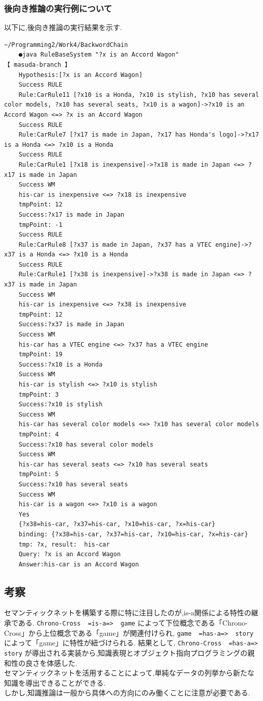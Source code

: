 \documentclass[uplatex,12pt]{jsarticle}
\begin{document}
\subsubsection{後向き推論の実行例について}
以下に,後向き推論の実行結果を示す.
\begin{lstlisting}[caption=後向き推論の実行結果, label=mid]
    ~/Programming2/Work4/BackwordChain
    ●java RuleBaseSystem "?x is an Accord Wagon"                                                                                                                                                                              【 masuda-branch 】
    Hypothesis:[?x is an Accord Wagon]
    Success RULE
    Rule:CarRule11 [?x10 is a Honda, ?x10 is stylish, ?x10 has several color models, ?x10 has several seats, ?x10 is a wagon]->?x10 is an Accord Wagon <=> ?x is an Accord Wagon
    Success RULE
    Rule:CarRule7 [?x17 is made in Japan, ?x17 has Honda's logo]->?x17 is a Honda <=> ?x10 is a Honda
    Success RULE
    Rule:CarRule1 [?x18 is inexpensive]->?x18 is made in Japan <=> ?x17 is made in Japan
    Success WM
    his-car is inexpensive <=> ?x18 is inexpensive
    tmpPoint: 12
    Success:?x17 is made in Japan
    tmpPoint: -1
    Success RULE
    Rule:CarRule8 [?x37 is made in Japan, ?x37 has a VTEC engine]->?x37 is a Honda <=> ?x10 is a Honda
    Success RULE
    Rule:CarRule1 [?x38 is inexpensive]->?x38 is made in Japan <=> ?x37 is made in Japan
    Success WM
    his-car is inexpensive <=> ?x38 is inexpensive
    tmpPoint: 12
    Success:?x37 is made in Japan
    Success WM
    his-car has a VTEC engine <=> ?x37 has a VTEC engine
    tmpPoint: 19
    Success:?x10 is a Honda
    Success WM
    his-car is stylish <=> ?x10 is stylish
    tmpPoint: 3
    Success:?x10 is stylish
    Success WM
    his-car has several color models <=> ?x10 has several color models
    tmpPoint: 4
    Success:?x10 has several color models
    Success WM
    his-car has several seats <=> ?x10 has several seats
    tmpPoint: 5
    Success:?x10 has several seats
    Success WM
    his-car is a wagon <=> ?x10 is a wagon
    Yes
    {?x38=his-car, ?x37=his-car, ?x10=his-car, ?x=his-car}
    binding: {?x38=his-car, ?x37=his-car, ?x10=his-car, ?x=his-car}
    tmp: ?x, result:  his-car
    Query: ?x is an Accord Wagon
    Answer:his-car is an Accord Wagon
\end{lstlisting}


\subsection{考察}
セマンティックネットを構築する際に特に注目したのが,is-a関係による特性の継承である.
\verb|Chrono-Cross  =is-a=>  game| によって下位概念である「Chrono-Cross」から上位概念である「game」が関連付けられ,
\verb|game  =has-a=>  story| によって「game」に特性が紐づけられる.
結果として, \verb|Chrono-Cross  =has-a=>  story| が導出される実装から,知識表現とオブジェクト指向プログラミングの親和性の良さを体感した. \\
セマンティックネットを活用することによって,単純なデータの列挙から新たな知識を導出できることができる. \\
しかし,知識推論は一般から具体への方向にのみ働くことに注意が必要である.
\end{document}

